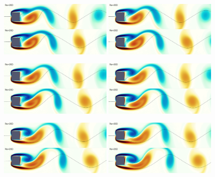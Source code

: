 \begin{figure}
  \centering
  \includegraphics[width=0.49\textwidth]{./fig/AR1/snap/snap.0000.png}
  \includegraphics[width=0.49\textwidth]{./fig/AR1/snap/snap.0005.png}
  \includegraphics[width=0.49\textwidth]{./fig/AR1/snap/snap.0010.png}
  \includegraphics[width=0.49\textwidth]{./fig/AR1/snap/snap.0015.png}
  \includegraphics[width=0.49\textwidth]{./fig/AR1/snap/snap.0020.png}
  \includegraphics[width=0.49\textwidth]{./fig/AR1/snap/snap.0025.png}

\end{figure}
